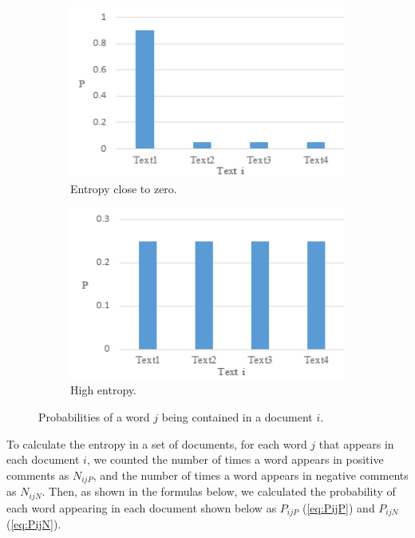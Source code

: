 \documentclass[review]{elsarticle}
\begin{document}
\begin{figure}[h]
    \centering
    \begin{subfigure}[b]{0.4\linewidth}
        \includegraphics[width=\linewidth]{entropyzero.png}
        \caption{Entropy close to zero.}
    \end{subfigure}
    \begin{subfigure}[b]{0.4\linewidth}
        \includegraphics[width=\linewidth]{entropyhigh.png}
        \caption{High entropy.}
    \end{subfigure}
\caption{Probabilities of a word \(j\) being contained in a document \(i\).}
\label{fig:entropygraphs}
\end{figure}

To calculate the entropy in a set of documents, for each word \(j\) that appears in each document \(i\), we counted the number of times a word appears in positive comments as \(N_{ijP}\), and the number of times a word appears in negative comments as \(N_{ijN}\). Then, as shown in the formulas below, we calculated the probability of each word appearing in each document shown below as \(P_{ijP}\) (\ref{eq:PijP}) and \(P_{ijN}\) (\ref{eq:PijN}).
\end{document}
